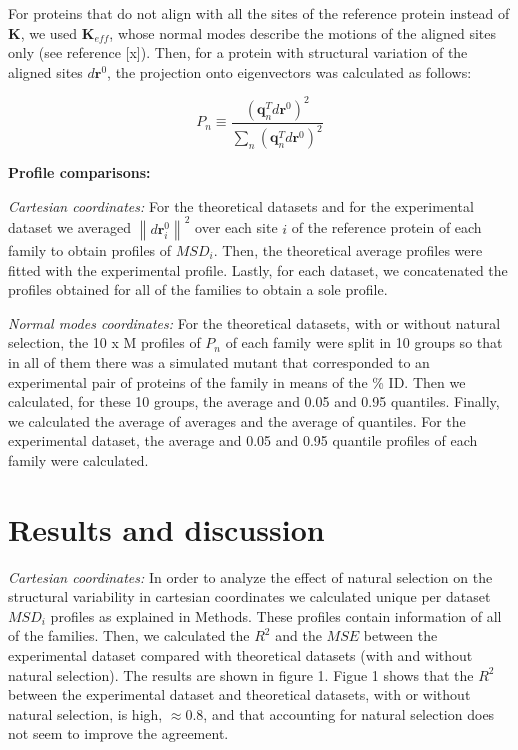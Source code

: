 \documentclass{article}
\begin{document}
For proteins that do not align with all the sites of the reference protein instead of $\mathbf{K}$, we used $\mathbf{K}_{eff}$, whose normal modes describe the motions of the aligned sites only (see reference [x]).
Then, for a protein with structural variation of the aligned sites $d\mathbf{r}^{0}$, the projection onto eigenvectors was calculated as follows:

\begin{equation}
P_{n} \equiv \frac{(\mathbf{q}^{T}_{n}d\mathbf{r}^{0})^2}{\sum_{n}(\mathbf{q}^{T}_{n}d\mathbf{r}^{0})^2}
\end{equation}

{\bf Profile comparisons:}

{\it Cartesian coordinates:} For the theoretical datasets and for the experimental dataset we averaged $\left\|d\mathbf{r}^{0}_{i}\right\|^{2}$ over each site $i$ of the reference protein of each family to obtain profiles of $MSD_{i}$. Then, the theoretical average profiles were fitted with the experimental profile. Lastly, for each dataset, we concatenated the profiles obtained for all of the families to obtain a sole profile.

{\it Normal modes coordinates:} For the theoretical datasets, with or without natural selection, the 10 x M profiles of $P_{n}$ of each family were split in 10 groups so that in all of them there was a simulated mutant that corresponded to an experimental pair of proteins of the family in means of the \% ID. Then we calculated, for these 10 groups, the average and 0.05 and 0.95 quantiles. Finally, we calculated the average of averages and the average of quantiles. 
For the experimental dataset, the average and 0.05 and 0.95 quantile profiles of each family were calculated.

\section{Results and discussion}
{\it Cartesian coordinates:}
In order to analyze the effect of natural selection on the structural variability in cartesian coordinates we calculated unique per dataset $MSD_{i}$ profiles as explained in Methods. These profiles contain information of all of the families. Then, we calculated the $R^2$ and the $MSE$ between the experimental dataset compared with theoretical datasets (with and without natural selection). The results are shown in figure 1. 
Figue 1 shows that the $R^2$ between the experimental dataset and theoretical datasets, with or without natural selection, is high, $\approx 0.8$, and that accounting for natural selection does not seem to improve the agreement. 
\end{document}
